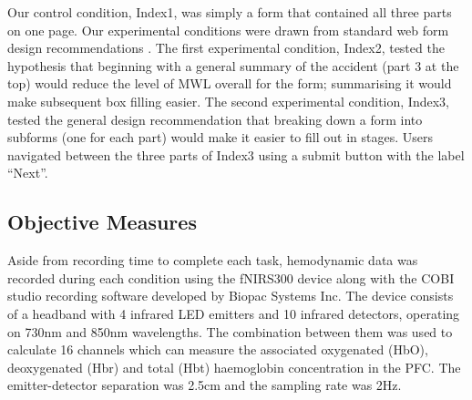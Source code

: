 \documentclass[../main/Feedback.tex]{subfiles}
\begin{document}
Our control condition, Index1, was simply a form that contained all three parts on one page.
Our experimental conditions were drawn from standard web form design recommendations \cite{wroblewski2008web}.
The first experimental condition, Index2, tested the hypothesis that beginning with a general summary of the accident (part 3 at the top) would reduce the level of MWL overall for the form; summarising it would make subsequent box filling easier.
The second experimental condition, Index3, tested the general design recommendation that breaking down a form into subforms (one for each part) would make it easier to fill out in stages.
Users navigated between the three parts of Index3 using a submit button with the label ``Next''.




\subsection{Objective Measures}
Aside from recording time to complete each task, hemodynamic data was recorded during each condition using the fNIRS300 device along with the COBI studio recording software developed by Biopac Systems Inc.
The device consists of a headband with 4 infrared LED emitters and 10 infrared detectors, operating on 730nm and 850nm wavelengths.
The combination between them was used to calculate 16 channels which can measure the associated oxygenated (HbO), deoxygenated (Hbr) and total (Hbt) haemoglobin concentration in the PFC.
The emitter-detector separation was 2.5cm and the sampling rate was 2Hz.
\end{document}
